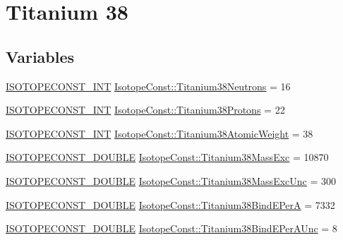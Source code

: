 \hypertarget{group___isotope_const-_titanium-_ti38}{}\section{Titanium 38}
\label{group___isotope_const-_titanium-_ti38}
\subsection*{Variables}
\begin{DoxyCompactItemize}
\item 
\mbox{\hyperlink{group___isotope_const-_macros_ga5f18360b3e99483a35c32d789e62621c}{I\+S\+O\+T\+O\+P\+E\+C\+O\+N\+S\+T\+\_\+\+I\+NT}} \mbox{\hyperlink{group___isotope_const-_titanium-_ti38_ga170ef8328394d8a5bda9f7326dc900d4}{Isotope\+Const\+::\+Titanium38\+Neutrons}} = 16
\item 
\mbox{\hyperlink{group___isotope_const-_macros_ga5f18360b3e99483a35c32d789e62621c}{I\+S\+O\+T\+O\+P\+E\+C\+O\+N\+S\+T\+\_\+\+I\+NT}} \mbox{\hyperlink{group___isotope_const-_titanium-_ti38_ga61b43cb51b642021299aba7010a537d5}{Isotope\+Const\+::\+Titanium38\+Protons}} = 22
\item 
\mbox{\hyperlink{group___isotope_const-_macros_ga5f18360b3e99483a35c32d789e62621c}{I\+S\+O\+T\+O\+P\+E\+C\+O\+N\+S\+T\+\_\+\+I\+NT}} \mbox{\hyperlink{group___isotope_const-_titanium-_ti38_gaf88ccf0f37670bb4047493ab51420144}{Isotope\+Const\+::\+Titanium38\+Atomic\+Weight}} = 38
\item 
\mbox{\hyperlink{group___isotope_const-_macros_ga8f45a7272ce02c0b4c65c44636ed719a}{I\+S\+O\+T\+O\+P\+E\+C\+O\+N\+S\+T\+\_\+\+D\+O\+U\+B\+LE}} \mbox{\hyperlink{group___isotope_const-_titanium-_ti38_gabeb0164d69f1fae7e9f2637976141149}{Isotope\+Const\+::\+Titanium38\+Mass\+Exc}} = 10870
\item 
\mbox{\hyperlink{group___isotope_const-_macros_ga8f45a7272ce02c0b4c65c44636ed719a}{I\+S\+O\+T\+O\+P\+E\+C\+O\+N\+S\+T\+\_\+\+D\+O\+U\+B\+LE}} \mbox{\hyperlink{group___isotope_const-_titanium-_ti38_gaa33d428c763cffc7504991f5815acda1}{Isotope\+Const\+::\+Titanium38\+Mass\+Exc\+Unc}} = 300
\item 
\mbox{\hyperlink{group___isotope_const-_macros_ga8f45a7272ce02c0b4c65c44636ed719a}{I\+S\+O\+T\+O\+P\+E\+C\+O\+N\+S\+T\+\_\+\+D\+O\+U\+B\+LE}} \mbox{\hyperlink{group___isotope_const-_titanium-_ti38_ga9c0b9f06b5e54209a29239c1abc44dc4}{Isotope\+Const\+::\+Titanium38\+Bind\+E\+PerA}} = 7332
\item 
\mbox{\hyperlink{group___isotope_const-_macros_ga8f45a7272ce02c0b4c65c44636ed719a}{I\+S\+O\+T\+O\+P\+E\+C\+O\+N\+S\+T\+\_\+\+D\+O\+U\+B\+LE}} \mbox{\hyperlink{group___isotope_const-_titanium-_ti38_ga6d70519f53528850986c45f756ef6e16}{Isotope\+Const\+::\+Titanium38\+Bind\+E\+Per\+A\+Unc}} = 8

\end{DoxyCompactItemize}
